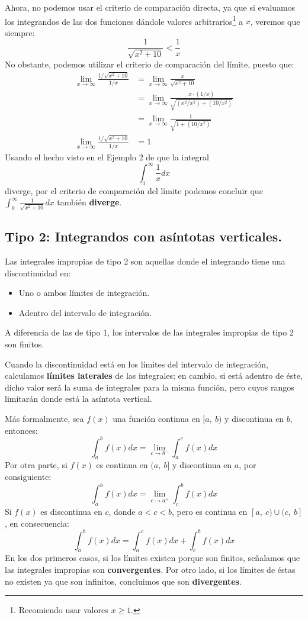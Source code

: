 \documentclass[12pt]{article}
\begin{document}
Ahora, no podemos usar el criterio de comparación directa, ya que si evaluamos los integrandos de las dos funciones dándole valores arbitrarios\footnote{Recomiendo usar valores $x \geq 1$.} a $x$, veremos que siempre:
\[
  \frac{1}{\sqrt{x^{2} + 10}} < \frac{1}{x}
\]
No obstante, podemos utilizar el criterio de comparación del límite, puesto que:
\begin{align*}
  \lim_{x \to \infty} \frac{1/\sqrt{x^{2} + 10}}{1/x} &= \lim_{x \to \infty} \frac{x}{\sqrt{x^{2} + 10}} \\
                                                      &= \lim_{x \to \infty} \frac{x \cdot (1/x)}{\sqrt{(x^{2}/x^{2}) + (10/x^{2})}} \\
                                                      &= \lim_{x \to \infty} \frac{1}{\sqrt{1 + (10/x^{2})}} \\
  \lim_{x \to \infty} \frac{1/\sqrt{x^{2} + 10}}{1/x} &= 1
\end{align*}
Usando el hecho visto en el Ejemplo 2 de que la integral
\[
  \int_{1}^{\infty} \frac{1}{x} dx
\]
diverge, por el criterio de comparación del límite podemos concluir que $\int_{0}^{\infty} \frac{1}{\sqrt{x^{2} + 10}} dx$ también \textbf{diverge}.

\subsection{Tipo 2: Integrandos con asíntotas verticales.}

Las integrales impropias de tipo 2 son aquellas donde el integrando tiene una discontinuidad en:

\begin{itemize}
\item Uno o ambos límites de integración.
\item Adentro del intervalo de integración.
\end{itemize}

A diferencia de las de tipo 1, los intervalos de las integrales impropias de tipo 2 son finitos.

Cuando la discontinuidad está en los límites del intervalo de integración, calculamos \textbf{límites laterales} de las integrales; en cambio, si está adentro de éste, dicho valor será la suma de integrales para la misma función, pero cuyos rangos limitarán donde está la asíntota vertical.

Más formalmente, sea $f(x)$ una función continua en $[a, \ b)$ y discontinua en $b$, entonces:
\[
  \int_{a}^{b} f(x)dx = \lim_{c \to b^{-}} \int_{a}^{c} f(x)dx
\]
Por otra parte, si $f(x)$ es continua en $(a, \ b]$ y discontinua en $a$, por consiguiente:
\[
  \int_{a}^{b} f(x)dx = \lim_{c \to a^{+}} \int_{c}^{b} f(x)dx
\]
Si $f(x)$ es discontinua en $c$, donde $a < c < b$, pero es continua en $[a, \ c) \cup (c, \ b]$, en consecuencia:
\[
  \int_{a}^{b} f(x)dx = \int_{a}^{c} f(x)dx + \int_{c}^{b} f(x)dx
\]
En los dos primeros casos, si los límites existen porque son finitos, señalamos que las integrales impropias son \textbf{convergentes}. Por otro lado, si los límites de éstas no existen ya que son infinitos, concluimos que son \textbf{divergentes}.
\end{document}
